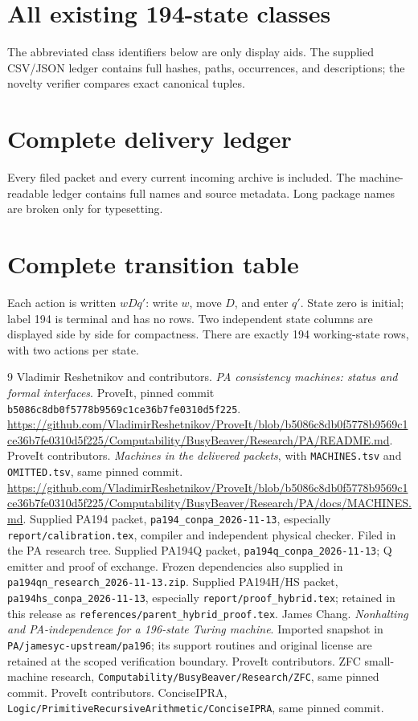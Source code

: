 \documentclass[11pt,letterpaper]{article}
\newcommand{\file}[1]{\texttt{\nolinkurl{#1}}}
\newcommand{\snapshot}{\texttt{b5086c8db0f5778b9569c1ce36b7fe0310d5f225}}
\begin{document}
\clearpage
\appendix
\section{All existing 194-state classes}
\label{app:frontier}
The abbreviated class identifiers below are only display aids. The supplied
CSV/JSON ledger contains full hashes, paths, occurrences, and descriptions;
the novelty verifier compares exact canonical tuples.


\clearpage
\section{Complete delivery ledger}
\label{app:packets}
Every filed packet and every current incoming archive is included. The
machine-readable ledger contains full names and source metadata. Long
package names are broken only for typesetting.


\clearpage
\section{Complete transition table}
\label{app:table}
Each action is written $wDq'$: write $w$, move $D$, and enter $q'$.
State zero is initial; label 194 is terminal and has no rows. Two independent
state columns are displayed side by side for compactness. There are exactly
194 working-state rows, with two actions per state.


\clearpage
\begin{thebibliography}{9}
 Vladimir Reshetnikov and contributors.
\emph{PA consistency machines: status and formal interfaces}.
ProveIt, pinned commit \snapshot.
\url{https://github.com/VladimirReshetnikov/ProveIt/blob/b5086c8db0f5778b9569c1ce36b7fe0310d5f225/Computability/BusyBeaver/Research/PA/README.md}.
 ProveIt contributors.
\emph{Machines in the delivered packets}, with \file{MACHINES.tsv} and
\file{OMITTED.tsv}, same pinned commit.
\url{https://github.com/VladimirReshetnikov/ProveIt/blob/b5086c8db0f5778b9569c1ce36b7fe0310d5f225/Computability/BusyBeaver/Research/PA/docs/MACHINES.md}.
 Supplied PA194 packet,
\file{pa194_conpa_2026-11-13}, especially \file{report/calibration.tex},
compiler and independent physical checker. Filed in the PA research tree.
 Supplied PA194Q packet, \file{pa194q_conpa_2026-11-13};
Q emitter and proof of exchange. Frozen dependencies also supplied in
\file{pa194qn_research_2026-11-13.zip}.
 Supplied PA194H/HS packet,
\file{pa194hs_conpa_2026-11-13}, especially \file{report/proof_hybrid.tex};
retained in this release as \file{references/parent_hybrid_proof.tex}.
 James Chang. \emph{Nonhalting and PA-independence for a
196-state Turing machine}. Imported snapshot in
\file{PA/jamesyc-upstream/pa196}; its support routines and original license
are retained at the scoped verification boundary.
 ProveIt contributors. ZFC small-machine research,
\file{Computability/BusyBeaver/Research/ZFC}, same pinned commit.
 ProveIt contributors. ConciseIPRA,
\file{Logic/PrimitiveRecursiveArithmetic/ConciseIPRA}, same pinned commit.
\end{thebibliography}
\end{document}

